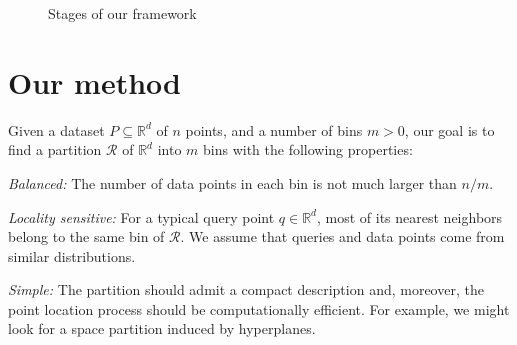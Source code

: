 \documentclass[11pt]{article}
\begin{document}
\begin{figure}%
    \centering
    \hfill
    \hfill
    \caption{Stages of our framework}
        \label{piotr_fig:pipeline}
\end{figure}


\section{Our method}

Given a dataset $P\subseteq\mathbb{R}^d$ of $n$ points, and a number of bins $m>0$, our goal is to find a partition $\mathcal{R}$ of $\mathbb{R}^d$ into $m$ bins with the following properties:
\begin{CompactEnumerate}
    \item\emph{Balanced:} The number of data points in each bin is not much larger than $n / m$.
    \item\emph{Locality sensitive:} For a typical query point $q \in \mathbb{R}^d$, most of its nearest neighbors belong to the same bin of $\mathcal{R}$. We assume that queries and data points come from similar distributions.
    \item\emph{Simple:} The partition should admit a compact description
    and, moreover, the point location process should be computationally efficient. For example, we might look for a space partition induced by hyperplanes.
\end{CompactEnumerate}
\end{document}
